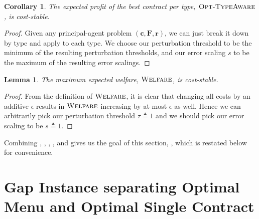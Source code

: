 \documentclass{article}
\newtheorem{lemma}[theorem]{Lemma}
\newtheorem{corollary}[theorem]{Corollary}
\newcommand{\costvector}{\bm{c}}
\newcommand{\ForecastTensor}{\bm{F}}
\newcommand{\rewardvector}{\bm{r}}
\newcommand{\PrincipalAgentProblem}{\left(\costvector, \ForecastTensor, \rewardvector\right)}
\newcommand{\OWelfare}{\textsc{Welfare}}
\newcommand{\OTypeAware}{\textsc{Opt-TypeAware}}
\begin{document}
\begin{corollary}
\label{cor:type-aware-stable}
  The expected profit of the best contract per type, $\OTypeAware$, is cost-stable.
\end{corollary}

\begin{proof}
  Given any principal-agent problem $\PrincipalAgentProblem$, we can just break it down by type and apply  to each type. We choose our perturbation threshold to be the minimum of the resulting perturbation thresholds, and our error scaling $s$ to be the maximum of the resulting error scalings.
\end{proof}

\begin{lemma}
\label{lem:welfare-stable}
  The maximum expected welfare, $\OWelfare$, is cost-stable.
\end{lemma}

\begin{proof}
  From the definition of $\OWelfare$, it is clear that changing all costs by an additive $\epsilon$ results in $\OWelfare$ increasing by at most $\epsilon$ as well. Hence we can arbitrarily pick our perturbation threshold $\tau \triangleq 1$ and we should pick our error scaling to be $s \triangleq 1$.
\end{proof}

Combining , , , , and  gives us the goal of this section, , which is restated below for convenience.

\coststablecorollary*%
\section{Gap Instance separating Optimal Menu and Optimal Single Contract}
\label{apx:gap3v4}
\end{document}
